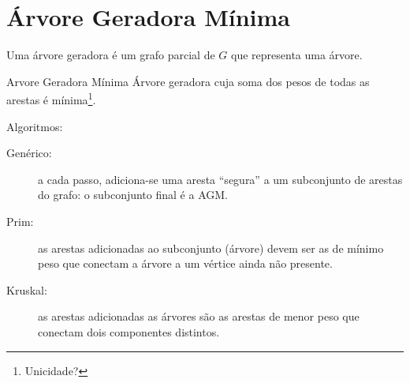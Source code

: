 
\section{Árvore Geradora Mínima}%
\begin{frame}[label=notas]
	Uma árvore geradora é um grafo parcial de $G$ que representa uma árvore.
	\\\vfill\pause
	\begin{block}{Arvore Geradora Mínima}
		Árvore geradora cuja soma dos pesos de todas as arestas é mínima\footnote[frame]{Unicidade?}.
	\end{block}
	\vfill\pause
	Algoritmos:
	\begin{description}
		\item[Genérico:] a cada passo, adiciona-se uma aresta ``segura''
		a um subconjunto de arestas do grafo: o subconjunto final é a AGM.
		\item[Prim:] as arestas adicionadas ao subconjunto (árvore)
		devem ser as de mínimo peso que conectam a árvore a um vértice ainda não presente.
		\item[Kruskal:] as arestas adicionadas as árvores são as arestas
		de menor peso que conectam dois componentes distintos.
	\end{description}
\end{frame}

